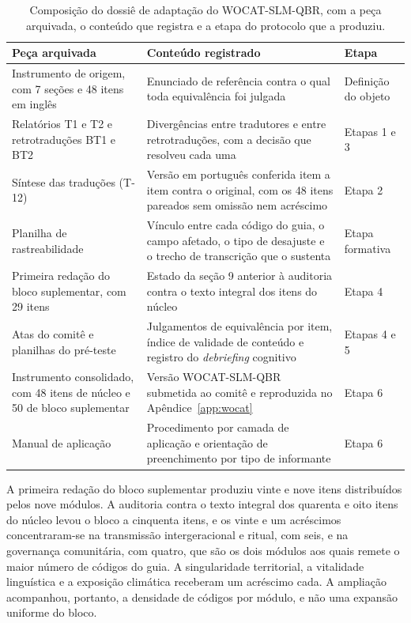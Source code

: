 \documentclass[preprint,authoryear,12pt]{elsarticle}
\newcommand{\fonte}[1]{%
  \par\vspace{2pt}\noindent{\footnotesize Fonte: #1}\par}
\begin{document}
\begin{table}[H]
\centering
\caption{Composição do dossiê de adaptação do WOCAT-SLM-QBR, com a peça arquivada, o conteúdo que registra e a etapa do protocolo que a produziu.}
\label{tab:dossie}
\footnotesize
\setlength{\tabcolsep}{4pt}
\begin{tabular}{p{4.0cm}p{7.1cm}p{1.8cm}}
\toprule
\textbf{Peça arquivada} & \textbf{Conteúdo registrado} & \textbf{Etapa} \\
\midrule
Instrumento de origem, com 7 seções e 48 itens em inglês & Enunciado de referência contra o qual toda equivalência foi julgada & Definição do objeto \\
\addlinespace
Relatórios T1 e T2 e retrotraduções BT1 e BT2 & Divergências entre tradutores e entre retrotraduções, com a decisão que resolveu cada uma & Etapas 1 e 3 \\
\addlinespace
Síntese das traduções (T-12) & Versão em português conferida item a item contra o original, com os 48 itens pareados sem omissão nem acréscimo & Etapa 2 \\
\addlinespace
Planilha de rastreabilidade & Vínculo entre cada código do guia, o campo afetado, o tipo de desajuste e o trecho de transcrição que o sustenta & Etapa formativa \\
\addlinespace
Primeira redação do bloco suplementar, com 29 itens & Estado da seção 9 anterior à auditoria contra o texto integral dos itens do núcleo & Etapa 4 \\
\addlinespace
Atas do comitê e planilhas do pré-teste & Julgamentos de equivalência por item, índice de validade de conteúdo e registro do \textit{debriefing} cognitivo & Etapas 4 e 5 \\
\addlinespace
Instrumento consolidado, com 48 itens de núcleo e 50 de bloco suplementar & Versão WOCAT-SLM-QBR submetida ao comitê e reproduzida no Apêndice~\ref{app:wocat} & Etapa 6 \\
\addlinespace
Manual de aplicação & Procedimento por camada de aplicação e orientação de preenchimento por tipo de informante & Etapa 6 \\
\bottomrule
\end{tabular}
\fonte{\textbf{Elaborado pelos autores} (2026).}
\end{table}

A primeira redação do bloco suplementar produziu vinte e nove itens distribuídos pelos nove módulos. A auditoria contra o texto integral dos quarenta e oito itens do núcleo levou o bloco a cinquenta itens, e os vinte e um acréscimos concentraram-se na transmissão intergeracional e ritual, com seis, e na governança comunitária, com quatro, que são os dois módulos aos quais remete o maior número de códigos do guia. A singularidade territorial, a vitalidade linguística e a exposição climática receberam um acréscimo cada. A ampliação acompanhou, portanto, a densidade de códigos por módulo, e não uma expansão uniforme do bloco.
\end{document}
